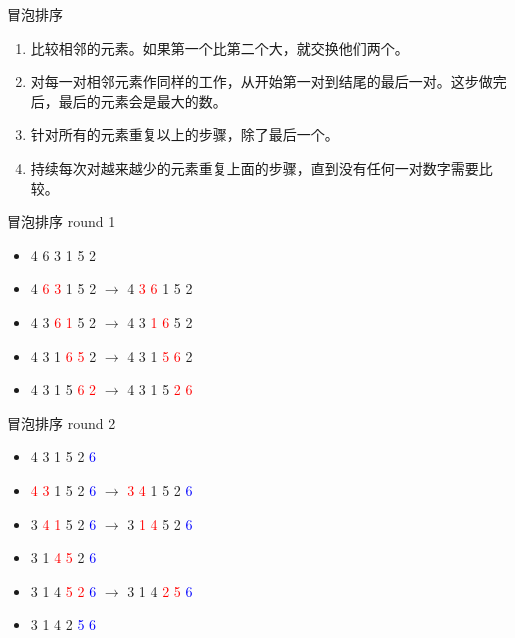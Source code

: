 \documentclass[aspectratio=169,xcolor=dvipsnames]{beamer}
\begin{document}
\begin{frame}{冒泡排序}
    \begin{enumerate}
        \item 比较相邻的元素。如果第一个比第二个大，就交换他们两个。
        \item 对每一对相邻元素作同样的工作，从开始第一对到结尾的最后一对。这步做完后，最后的元素会是最大的数。
        \item 针对所有的元素重复以上的步骤，除了最后一个。
        \item 持续每次对越来越少的元素重复上面的步骤，直到没有任何一对数字需要比较。
    \end{enumerate}
\end{frame}

\begin{frame}{冒泡排序 round 1}
    \begin{itemize}
        \item 4 6 3 1 5 2
        \item 4 \textcolor{red}{6 3} 1 5 2 $\rightarrow$ 4 \textcolor{red}{3 6} 1 5 2
        \item 4 3 \textcolor{red}{6 1} 5 2 $\rightarrow$ 4 3 \textcolor{red}{1 6} 5 2
        \item 4 3 1 \textcolor{red}{6 5} 2 $\rightarrow$ 4 3 1 \textcolor{red}{5 6} 2
        \item 4 3 1 5 \textcolor{red}{6 2} $\rightarrow$ 4 3 1 5 \textcolor{red}{2 6}
    \end{itemize}
\end{frame}

\begin{frame}{冒泡排序 round 2}
    \begin{itemize}
        \item 4 3 1 5 2 \textcolor{blue}{6}
        \item \textcolor{red}{4 3} 1 5 2 \textcolor{blue}{6} $\rightarrow$ \textcolor{red}{3 4} 1 5 2 \textcolor{blue}{6}
        \item 3 \textcolor{red}{4 1} 5 2 \textcolor{blue}{6} $\rightarrow$ 3 \textcolor{red}{1 4} 5 2 \textcolor{blue}{6}
        \item 3 1 \textcolor{red}{4 5} 2 \textcolor{blue}{6}
        \item 3 1 4 \textcolor{red}{5 2} \textcolor{blue}{6} $\rightarrow$ 3 1 4 \textcolor{red}{2 5} \textcolor{blue}{6}
        \item 3 1 4 2 \textcolor{blue}{5 6}
    \end{itemize}
\end{frame}
\end{document}
